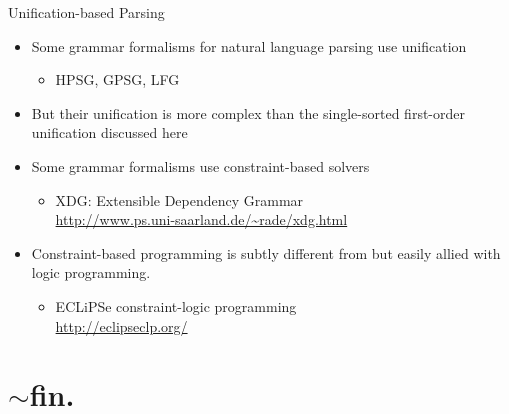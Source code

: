 \documentclass[pdf,fyma2]{prosper} %
\begin{document}
\begin{slide}{Unification-based Parsing}
	\vspace{1em}
	\begin{itemize}
	\item Some grammar formalisms for natural language parsing use unification
        \begin{itemize}
        \item HPSG, GPSG, LFG
        \end{itemize}
    \item But their unification is more complex than the single-sorted first-order unification discussed here
	\vspace{2em}
    \item Some grammar formalisms use constraint-based solvers
        \begin{itemize}
        \item XDG: Extensible Dependency Grammar
            \\ \url{http://www.ps.uni-saarland.de/~rade/xdg.html}
        \end{itemize}
    \item Constraint-based programming is subtly different from but easily allied with logic programming.
        \begin{itemize}
        \item ECLiPSe constraint-logic programming
            \\ \url{http://eclipseclp.org/}
        \end{itemize}
	\end{itemize}
\end{slide}

\part{%
\fontsize{14.4pt}{12pt}\selectfont
$\sim$fin.%
}
\end{document}
